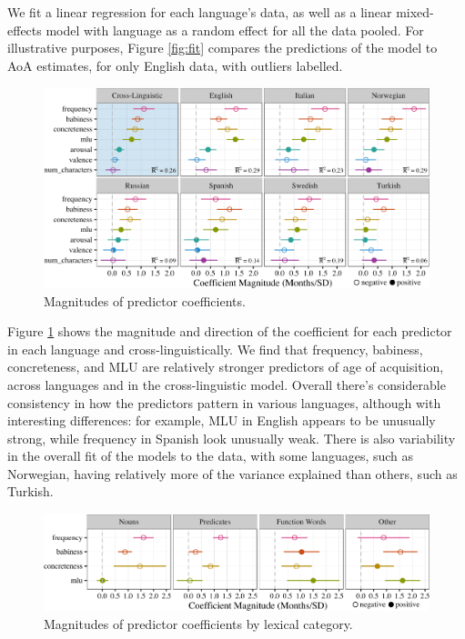 \documentclass[10pt, letterpaper]{article}
\newenvironment{CodeChunk}{}{}
\begin{document}
We fit a linear regression for each language's data, as well as a linear
mixed-effects model with language as a random effect for all the data
pooled. For illustrative purposes, Figure \ref{fig:fit} compares the
predictions of the model to AoA estimates, for only English data, with
outliers labelled.

\begin{CodeChunk}
\begin{figure}[tb]

{\centering \includegraphics{figs/coefs-1} 

}

\caption[Magnitudes of predictor coefficients]{Magnitudes of predictor coefficients.}\label{fig:coefs}
\end{figure}
\end{CodeChunk}

Figure \ref{fig:coefs} shows the magnitude and direction of the
coefficient for each predictor in each language and
cross-linguistically. We find that frequency, babiness, concreteness,
and MLU are relatively stronger predictors of age of acquisition, across
languages and in the cross-linguistic model. Overall there's
considerable consistency in how the predictors pattern in various
languages, although with interesting differences: for example, MLU in
English appears to be unusually strong, while frequency in Spanish look
unusually weak. There is also variability in the overall fit of the
models to the data, with some languages, such as Norwegian, having
relatively more of the variance explained than others, such as Turkish.

\begin{CodeChunk}
\begin{figure}[tb]

{\centering \includegraphics{figs/coefs_lexcat-1} 

}

\caption[Magnitudes of predictor coefficients by lexical category]{Magnitudes of predictor coefficients by lexical category.}\label{fig:coefs_lexcat}
\end{figure}
\end{CodeChunk}
\end{document}
